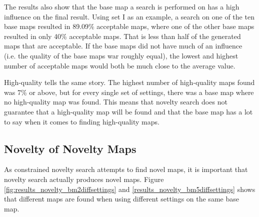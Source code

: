 The results also show that the base map a search is performed on has a high influence on the final result. Using set I as an example, a search on one of the ten base maps resulted in 89.09\% acceptable maps, where one of the other base maps resulted in only 40\% acceptable maps. That is less than half of the generated maps that are acceptable. If the base maps did not have much of an influence (i.e. the quality of the base maps war roughly equal), the lowest and highest number of acceptable maps would both be much close to the average value.

High-quality tells the same story. The highest number of high-quality maps found was 7\% or above, but for every single set of settings, there was a base map where no high-quality map was found. This means that novelty search does not guarantee that a high-quality map will be found and that the base map has a lot to say when it comes to finding high-quality maps.

\subsection*{Novelty of Novelty Maps}

As constrained novelty search attempts to find novel maps, it is important that novelty search actually produces novel maps. Figure \ref{fig:results_novelty_bm2diffsettings} and \ref{results_novelty_bm5diffsettings} shows that different maps are found when using different settings on the same base map.


